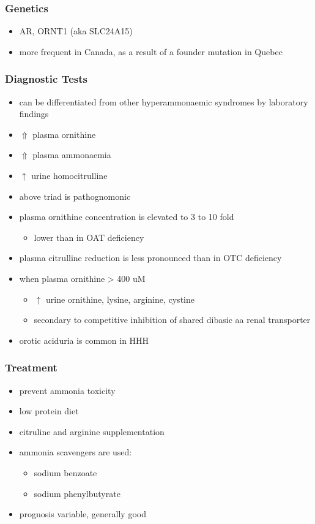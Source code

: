 \documentclass{scrartcl}
\begin{document}
\subsubsection{Genetics}
\label{sec:org5ea4cc4}
\begin{itemize}
\item AR, ORNT1 (aka SLC24A15)
\item more frequent in Canada, as a result of a founder mutation in Quebec
\end{itemize}

\subsubsection{Diagnostic Tests}
\label{sec:org0172ec4}
\begin{itemize}
\item can be differentiated from other hyperammonaemic syndromes by laboratory findings
\item \(\Uparrow\) plasma ornithine
\item \(\Uparrow\) plasma ammonaemia
\item \(\uparrow\) urine homocitrulline
\item above triad is pathognomonic
\item plasma ornithine concentration is elevated to 3 to 10 fold
\begin{itemize}
\item lower than in OAT deficiency
\end{itemize}
\item plasma citrulline reduction is less pronounced than in OTC
deficiency
\item when plasma ornithine \textgreater{} 400 uM
\begin{itemize}
\item \(\uparrow\) urine ornithine, lysine, arginine, cystine
\item secondary to competitive inhibition of shared dibasic aa renal
transporter
\end{itemize}
\item orotic aciduria is common in HHH
\end{itemize}

\subsubsection{Treatment}
\label{sec:org2de35cf}
\begin{itemize}
\item prevent ammonia toxicity
\item low protein diet
\item citruline and arginine supplementation
\item ammonia scavengers are used:
\begin{itemize}
\item sodium benzoate
\item sodium phenylbutyrate
\end{itemize}
\item prognosis variable, generally good
\end{itemize}
\end{document}
